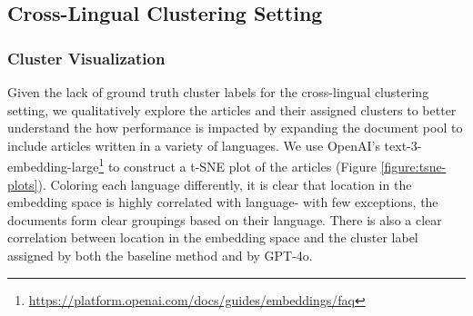 

\subsection{Cross-Lingual Clustering Setting}

\subsubsection{Cluster Visualization}

Given the lack of ground truth cluster labels for the cross-lingual clustering setting, we qualitatively explore the articles and their assigned clusters to better understand the how performance is impacted by expanding the document pool to include articles written in a variety of languages.
We use OpenAI's text-3-embedding-large\footnote{\url{https://platform.openai.com/docs/guides/embeddings/faq}} to construct a t-SNE plot of the articles (Figure \ref{figure:tsne-plots}).
Coloring each language differently, it is clear that location in the embedding space is highly correlated with language- with few exceptions, the documents form clear groupings based on their language.
There is also a clear correlation between location in the embedding space and the cluster label assigned by both the baseline method and by GPT-4o. 



